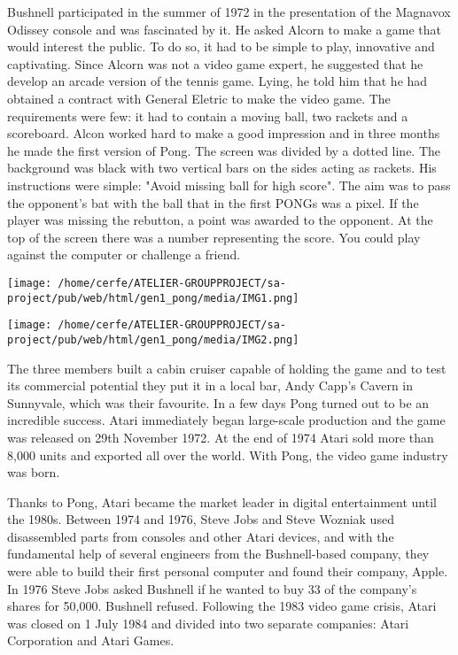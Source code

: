 \documentclass[a4paper,10pt]{book}
\begin{document}
Bushnell participated in the summer of 1972 in the presentation of the Magnavox Odissey console and was fascinated by it. He asked Alcorn to make a game that would interest the public. To do so, it had to be simple to play, innovative and captivating. Since Alcorn was not a video game expert, he suggested that he develop an arcade version of the tennis game. Lying, he told him that he had obtained a contract with General Eletric to make the video game. The requirements were few: it had to contain a moving ball, two rackets and a scoreboard. Alcon worked hard to make a good impression and in three months he made the first version of Pong.
The screen was divided by a dotted line. The background was black with two vertical bars on the sides acting as rackets. His instructions were simple: "Avoid missing ball for high score". The aim was to pass the opponent's bat with the ball that in the first PONGs was a pixel. If the player was missing the rebutton, a point was awarded to the opponent. At the top of the screen there was a number representing the score. You could play against the computer or challenge a friend.
 
 
 \texttt{[image: /home/cerfe/ATELIER-GROUPPROJECT/sa-project/pub/web/html/gen1\_pong/media/IMG1.png]}
 
 
 \texttt{[image: /home/cerfe/ATELIER-GROUPPROJECT/sa-project/pub/web/html/gen1\_pong/media/IMG2.png]}
 
 

The three members built a cabin cruiser capable of holding the game and to test its commercial potential they put it in a local bar, Andy Capp's Cavern in Sunnyvale, which was their favourite. In a few days Pong turned out to be an incredible success. Atari immediately began large-scale production and the game was released on 29th November 1972. At the end of 1974 Atari sold more than 8,000 units and exported all over the world. With Pong, the video game industry was born.

Thanks to Pong, Atari became the market leader in digital entertainment until the 1980s. Between 1974 and 1976, Steve Jobs and Steve Wozniak used disassembled parts from consoles and other Atari devices, and with the fundamental help of several engineers from the Bushnell-based company, they were able to build their first personal computer and found their company, Apple. In 1976 Steve Jobs asked Bushnell if he wanted to buy 33 of the company's shares for 50,000. Bushnell refused. Following the 1983 video game crisis, Atari was closed on 1 July 1984 and divided into two separate companies: Atari Corporation and Atari Games.
 
\end{document}
